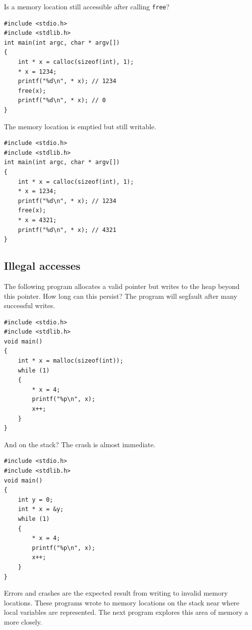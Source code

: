 \documentclass{book}
\begin{document}
Is a memory location still accessible after calling \texttt{free}?

\begin{lstlisting}[caption={todo}, captionpos=b, mathescape, xleftmargin=.25in, xrightmargin=.25in]
#include <stdio.h>
#include <stdlib.h>
int main(int argc, char * argv[])
{
    int * x = calloc(sizeof(int), 1);
    * x = 1234;
    printf("%d\n", * x); // 1234
    free(x);
    printf("%d\n", * x); // 0
}
\end{lstlisting}

The memory location is emptied but still writable. 

\begin{lstlisting}[caption={todo}, captionpos=b, mathescape, xleftmargin=.25in, xrightmargin=.25in]
#include <stdio.h>
#include <stdlib.h>
int main(int argc, char * argv[])
{
    int * x = calloc(sizeof(int), 1);
    * x = 1234;
    printf("%d\n", * x); // 1234
    free(x);
    * x = 4321;
    printf("%d\n", * x); // 4321
}
\end{lstlisting}

\subsection{Illegal accesses}

The following program allocates a valid pointer but writes to the heap beyond this pointer. How long can this persist? The program will segfault after many successful writes.

\begin{lstlisting}[caption={todo}, captionpos=b, mathescape, xleftmargin=.25in, xrightmargin=.25in]
#include <stdio.h>
#include <stdlib.h>
void main()
{
    int * x = malloc(sizeof(int));
    while (1)
    {
        * x = 4;
        printf("%p\n", x);
        x++;
    }
}
\end{lstlisting}

And on the stack? The crash is almost immediate.

\begin{lstlisting}[caption={todo}, captionpos=b, mathescape, xleftmargin=.25in, xrightmargin=.25in]
#include <stdio.h>
#include <stdlib.h>
void main()
{
    int y = 0;
    int * x = &y;
    while (1)
    {
        * x = 4;
        printf("%p\n", x);
        x++;
    }
}
\end{lstlisting}

Errors and crashes are the expected result from writing to invalid memory locations. These programs wrote to memory locations on the stack near where local variables are represented. The next program explores this area of memory a more closely.
\end{document}
